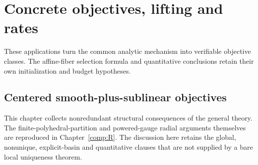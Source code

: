 \chapter{Concrete objectives, lifting and rates}\label{comp:F}\label{F:chapter}
\renewcommand{\ModuleTag}{6}
These applications turn the common analytic mechanism into verifiable objective classes. The affine-fiber selection formula and quantitative conclusions retain their own initialization and budget hypotheses.


\section{Centered smooth-plus-sublinear objectives}

This chapter collects nonredundant structural consequences of the general theory. The finite-polyhedral-partition and powered-gauge radial arguments themselves are reproduced in Chapter~\ref{comp:R}. The discussion here retains the global, nonunique, explicit-basin and quantitative clauses that are not supplied by a bare local uniqueness theorem.

